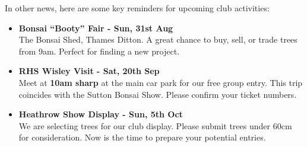 \medskip
\noindent
In other news, here are some key reminders for upcoming club activities:

\begin{itemize}
    \item \textbf{Bonsai ``Booty'' Fair - Sun, 31st Aug} \\
    The Bonsai Shed, Thames Ditton.
    A great chance to buy, sell, or trade trees from 9am.
    Perfect for finding a new project.

    \item \textbf{RHS Wisley Visit - Sat, 20th Sep} \\
    Meet at \textbf{10am sharp} at the main car park for our free group entry.
    This trip coincides with the Sutton Bonsai Show.
    Please confirm your ticket numbers.

    \item \textbf{Heathrow Show Display - Sun, 5th Oct} \\
    We are selecting trees for our club display.
    Please submit trees under 60cm for consideration.
    Now is the time to prepare your potential entries.
\end{itemize}
\closearticle
\clearpage
